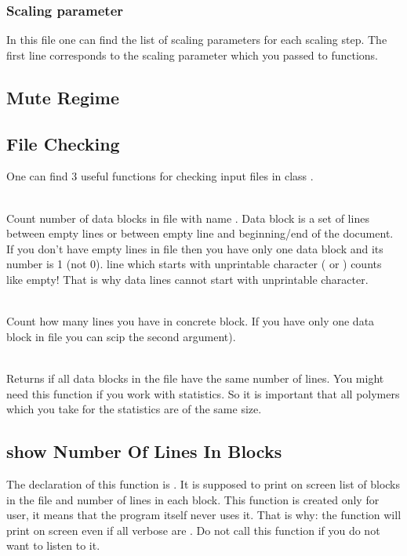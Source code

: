 \documentclass[12pt]{article}
\begin{document}
\begin{mySection}
\subsubsection{Scaling parameter}
In this file one can find the list of scaling parameters for each scaling step. The first line corresponds to the scaling parameter which you passed to  functions.



\end{mySection}



\begin{mySection}
\subsection{Mute Regime}
\subsection{File Checking}
One can find 3 useful functions for checking input files in class .

\\
Count number of data blocks in file with name . Data block is a set of lines between empty lines or between empty line and beginning/end of the document. If you don't have empty lines in file then you have only one data block and its number is 1 (not 0).
\important line which starts with unprintable character ( or ) counts like empty! That is why data lines cannot start with unprintable character.

\\
Count how many lines you have in concrete block. If you have only one data block in file you can scip the second argument).

\\
Returns  if all data blocks in the file have the same number of lines. You might need this function if you work with statistics. So it is important that all polymers which you take for the statistics are of the same size.

\subsection{show Number Of Lines In Blocks}\label{sec:linesInBlocks}
The declaration of this function is . 
It is supposed to print on screen list of blocks in the file and number of lines in each block. This function is created only for user, it means that the program itself never uses it. That is why:
\important the function will print on screen even if all verbose are . Do not call this function if you do not want to listen to it.



\end{mySection}
\end{document}
